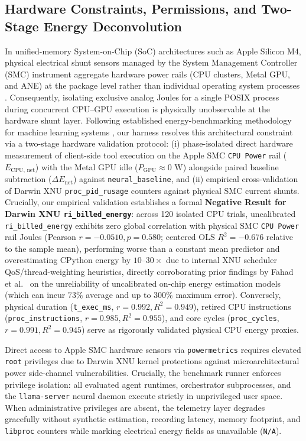 \documentclass[preprint,12pt,3p]{elsarticle}
\begin{document}
\subsection{Hardware Constraints, Permissions, and Two-Stage Energy Deconvolution}
In unified-memory System-on-Chip (SoC) architectures such as Apple Silicon M4, physical electrical shunt sensors managed by the System Management Controller (SMC) instrument aggregate hardware power rails (CPU clusters, Metal GPU, and ANE) at the package level rather than individual operating system processes \cite{fahad2019comparative}. Consequently, isolating exclusive analog Joules for a single POSIX process during concurrent CPU--GPU execution is physically unobservable at the hardware shunt layer. Following established energy-benchmarking methodology for machine learning systems \cite{you2023zeus, fahad2019comparative}, our harness resolves this architectural constraint via a two-stage hardware validation protocol: (i) phase-isolated direct hardware measurement of client-side tool execution on the Apple SMC \texttt{CPU Power} rail ($E_{\text{CPU, net}}$) with the Metal GPU idle ($P_{\text{GPU}} \approx 0\text{ W}$) alongside paired baseline subtraction ($\Delta E_{\text{net}}$) against \texttt{neural\_baseline}, and (ii) empirical cross-validation of Darwin XNU \texttt{proc\_pid\_rusage} counters against physical SMC current shunts. Crucially, our empirical validation establishes a formal \textbf{Negative Result for Darwin XNU \texttt{ri\_billed\_energy}}: across 120 isolated CPU trials, uncalibrated \texttt{ri\_billed\_energy} exhibits zero global correlation with physical SMC \texttt{CPU Power} rail Joules (Pearson $r = -0.0510, p = 0.580$; centered $\text{OLS } R^2 = -0.676$ relative to the sample mean), performing worse than a constant mean predictor and overestimating CPython energy by $10\text{--}30\times$ due to internal XNU scheduler QoS/thread-weighting heuristics, directly corroborating prior findings by Fahad et al.~\cite{fahad2019comparative} on the unreliability of uncalibrated on-chip energy estimation models (which can incur $73\%$ average and up to $300\%$ maximum error). Conversely, physical duration (\texttt{t\_exec\_ms}, $r = 0.992, R^2 = 0.949$), retired CPU instructions (\texttt{proc\_instructions}, $r = 0.985, R^2 = 0.955$), and core cycles (\texttt{proc\_cycles}, $r = 0.991, R^2 = 0.945$) serve as rigorously validated physical CPU energy proxies.

Direct access to Apple SMC hardware sensors via \texttt{powermetrics} requires elevated \texttt{root} privileges due to Darwin XNU kernel protections against microarchitectural power side-channel vulnerabilities. Crucially, the benchmark runner enforces privilege isolation: all evaluated agent runtimes, orchestrator subprocesses, and the \texttt{llama-server} neural daemon execute strictly in unprivileged user space. When administrative privileges are absent, the telemetry layer degrades gracefully without synthetic estimation, recording latency, memory footprint, and \texttt{libproc} counters while marking electrical energy fields as unavailable (\texttt{N/A}).
\end{document}
